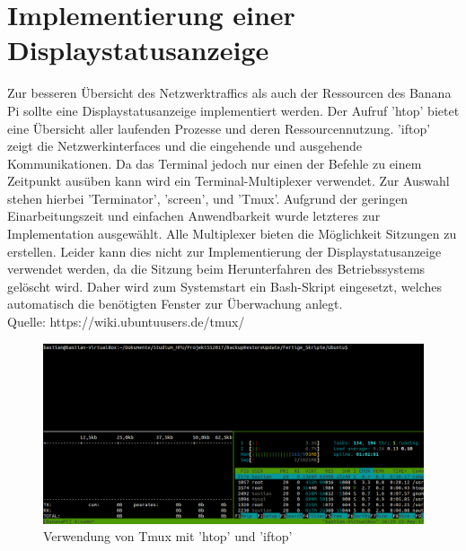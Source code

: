 \section{Implementierung einer Displaystatusanzeige}
Zur besseren Übersicht des Netzwerktraffics als auch der Ressourcen des Banana Pi sollte eine Displaystatusanzeige implementiert werden. Der Aufruf 'htop' bietet eine Übersicht aller laufenden Prozesse und deren Ressourcennutzung. 'iftop' zeigt die Netzwerkinterfaces und die eingehende und ausgehende Kommunikationen. Da das Terminal jedoch nur einen der Befehle zu einem Zeitpunkt ausüben kann wird ein Terminal-Multiplexer verwendet. Zur Auswahl stehen hierbei 'Terminator', 'screen', und 'Tmux'. Aufgrund der geringen Einarbeitungszeit und einfachen Anwendbarkeit wurde letzteres zur Implementation ausgewählt. Alle Multiplexer bieten die Möglichkeit Sitzungen zu erstellen. Leider kann dies nicht zur Implementierung der Displaystatusanzeige verwendet werden, da die Sitzung beim Herunterfahren des Betriebssystems gelöscht wird. Daher wird zum Systemstart ein Bash-Skript eingesetzt, welches automatisch die benötigten Fenster zur Überwachung anlegt.\\
Quelle: https://wiki.ubuntuusers.de/tmux/ \cite {tmux}
\begin{figure}[ht]
\includegraphics[width=\textwidth]{pictures/Bastian/Tmux}
\caption{Verwendung von Tmux mit 'htop' und 'iftop'}
\end{figure}

